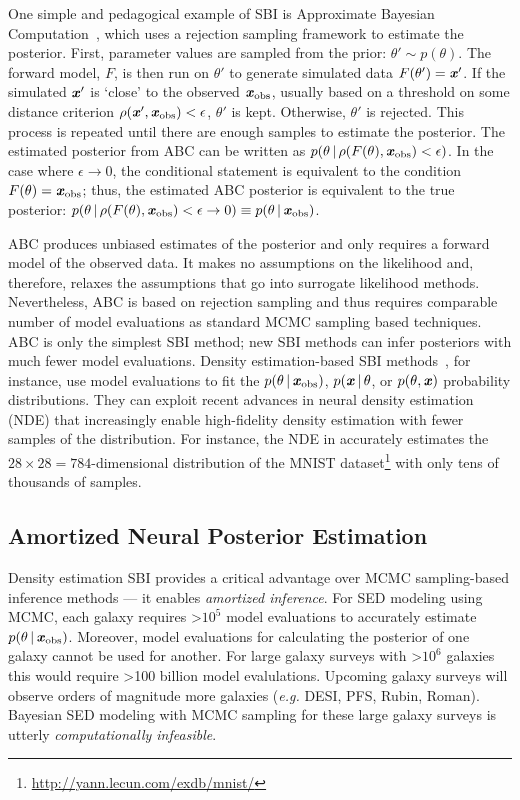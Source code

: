 One simple and pedagogical example of SBI is Approximate Bayesian
Computation~\citep[ABC;][]{rubin1984, pritchard1999, beaumont2002}, which uses
a rejection sampling framework to estimate the posterior. 
First, parameter values are sampled from the prior: $\theta'\sim p(\theta)$. 
The forward model, $F$, is then run on $\theta'$ to generate simulated data
$F(\theta') = \textbf{\textit{x}}'$.
If the simulated $\textbf{\textit{x}}'$ is `close' to the observed $\textbf{\textit{x}}_{\rm obs}$, usually based
on a threshold on some distance criterion $\rho(\textbf{\textit{x}}', \textbf{\textit{x}}_{\rm obs}) < \epsilon$, 
$\theta'$ is kept. 
Otherwise, $\theta'$ is rejected. 
This process is repeated until there are enough samples to estimate the
posterior. 
The estimated posterior from ABC can be written as 
$p(\theta \,|\, \rho(F(\theta), \textbf{\textit{x}}_{\rm obs}) < \epsilon)$. 
In the case where $\epsilon\rightarrow 0$, the conditional statement is
equivalent to the condition $F(\theta) = \textbf{\textit{x}}_{\rm obs}$; thus, the estimated ABC
posterior is  equivalent to the true posterior:
$p(\theta \,|\, \rho(F(\theta), \textbf{\textit{x}}_{\rm obs}) < \epsilon\rightarrow 0) \equiv
p(\theta \,|\, \textbf{\textit{x}}_{\rm obs})$.

ABC produces unbiased estimates of the posterior and only requires a forward
model of the observed data.
It makes no assumptions on the likelihood and, therefore, relaxes the
assumptions that go into surrogate likelihood methods. 
Nevertheless, ABC is based on rejection sampling and thus requires comparable
number of model evaluations as standard MCMC sampling based techniques. 
ABC is only the simplest SBI method; new SBI methods can infer posteriors with
much fewer model evaluations.
Density estimation-based SBI methods~\citep[\eg][]{papamakarios2017,
alsing2018, hahn2019c, greenberg2019, tejero-cantero2020}, for instance, use
model evaluations to fit the $p(\theta\,|\,\textbf{\textit{x}}_{\rm obs})$, $p(\textbf{\textit{x}}\,|\, \theta$,
or $p(\theta, \textbf{\textit{x}})$ probability distributions. 
They can exploit recent advances in neural density estimation (NDE) that
increasingly enable high-fidelity density estimation with fewer samples of the
distribution.
For instance, the NDE in \cite{papamakarios2017} accurately estimates the
$28\times28=784$-dimensional distribution of the MNIST
dataset\footnote{\url{http://yann.lecun.com/exdb/mnist/}} with only tens of
thousands of samples. 

\subsection{Amortized Neural Posterior Estimation} \label{sec:flow}
Density estimation SBI provides a critical advantage over MCMC sampling-based
inference methods --- it enables \emph{amortized inference}. 
For SED modeling using MCMC, each galaxy requires >$10^5$ model evaluations to
accurately estimate $p(\theta \,|\, \textbf{\textit{x}}_{\rm obs})$.
Moreover, model evaluations for calculating the posterior of one galaxy cannot
be used for another. 
For large galaxy surveys with >$10^6$
galaxies~\citep[\emph{e.g.} SDSS,][]{ahumada2020} this would require >100
billion model evalulations.
Upcoming galaxy surveys will observe orders of magnitude more galaxies
(\emph{e.g.} DESI, PFS, Rubin, Roman).
Bayesian SED modeling with MCMC sampling for these large galaxy surveys is
utterly \emph{computationally infeasible}.

